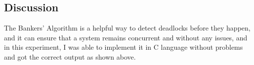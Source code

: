 \documentclass[pdftex,12pt,a4paper]{article}
\begin{document}
\subsection{Discussion}
The Bankers' Algorithm is a helpful way to detect deadlocks before they happen, and it can ensure that a system remains concurrent and without any issues, and in this experiment, I was able to implement it in C language without problems and got the correct output as shown above.
\end{document}
